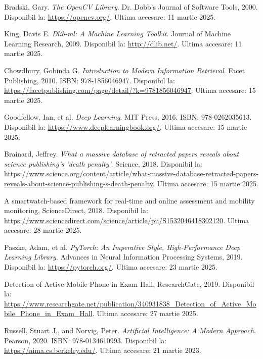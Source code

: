 \documentclass[12pt,a4paper]{article}
\begin{document}
\begin{thebibliography}{9}

Bradski, Gary. 
\textit{The OpenCV Library}. 
Dr. Dobb's Journal of Software Tools, 2000. 
Disponibil la: \url{https://opencv.org/}. 
Ultima accesare: 11 martie  2025.

King, Davis E. 
\textit{Dlib-ml: A Machine Learning Toolkit}. 
Journal of Machine Learning Research, 2009. 
Disponibil la: \url{http://dlib.net/}. 
Ultima accesare: 11 martie 2025.

Chowdhury, Gobinda G. 
\textit{Introduction to Modern Information Retrieval}. 
Facet Publishing, 2010. 
ISBN: 978-1856046947. 
Disponibil la: \url{https://facetpublishing.com/page/detail/?k=9781856046947}. 
Ultima accesare: 15 martie 2025.

Goodfellow, Ian, et al. 
\textit{Deep Learning}. 
MIT Press, 2016. 
ISBN: 978-0262035613. 
Disponibil la: \url{https://www.deeplearningbook.org/}. 
Ultima accesare: 15 martie 2025.

Brainard, Jeffrey. 
\textit{What a massive database of retracted papers reveals about science publishing's 'death penalty'}. 
Science, 2018. 
Disponibil la: \url{https://www.science.org/content/article/what-massive-database-retracted-papers-reveals-about-science-publishing-s-death-penalty}. 
Ultima accesare: 15 martie 2025.

A smartwatch-based framework for real-time and online assessment and mobility monitoring,
ScienceDirect,
2018.
Disponibil la: \url{https://www.sciencedirect.com/science/article/pii/S1532046418302120}.
Ultima accesare: 28 martie 2025.

Paszke, Adam, et al. 
\textit{PyTorch: An Imperative Style, High-Performance Deep Learning Library}. 
Advances in Neural Information Processing Systems, 2019. 
Disponibil la: \url{https://pytorch.org/}. 
Ultima accesare: 23 martie 2025.

Detection of Active Mobile Phone in Exam Hall,
ResearchGate,
2019.
Disponibil la: \url{https://www.researchgate.net/publication/340931838_Detection_of_Active_Mobile_Phone_in_Exam_Hall}.
Ultima accesare: 27 martie 2025.

Russell, Stuart J., and Norvig, Peter. 
\textit{Artificial Intelligence: A Modern Approach}. 
Pearson, 2020. 
ISBN: 978-0134610993. 
Disponibil la: \url{https://aima.cs.berkeley.edu/}. 
Ultima accesare: 21 martie 2023.


\end{thebibliography}
\end{document}

